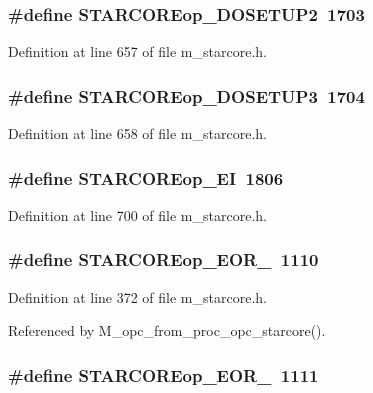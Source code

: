 \subsubsection{\setlength{\rightskip}{0pt plus 5cm}\#define STARCOREop\_\-DOSETUP2~1703}\label{m__starcore_8h_e6e2aed991ec56585f27b0fdb39714c2}




Definition at line 657 of file m\_\-starcore.h.
\subsubsection{\setlength{\rightskip}{0pt plus 5cm}\#define STARCOREop\_\-DOSETUP3~1704}\label{m__starcore_8h_ff180aa81b9477512b1577817a60f371}




Definition at line 658 of file m\_\-starcore.h.
\subsubsection{\setlength{\rightskip}{0pt plus 5cm}\#define STARCOREop\_\-EI~1806}\label{m__starcore_8h_7ccc400c93dbc220d3c4418671f13fca}




Definition at line 700 of file m\_\-starcore.h.
\subsubsection{\setlength{\rightskip}{0pt plus 5cm}\#define STARCOREop\_\-EOR\_~1110}\label{m__starcore_8h_9798cc2a30c7f50ab5769f9d3ee3a989}




Definition at line 372 of file m\_\-starcore.h.

Referenced by M\_\-opc\_\-from\_\-proc\_\-opc\_\-starcore().
\subsubsection{\setlength{\rightskip}{0pt plus 5cm}\#define STARCOREop\_\-EOR\_~1111}\label{m__starcore_8h_b6ad053c0adee36ab6738279097f1da5}





